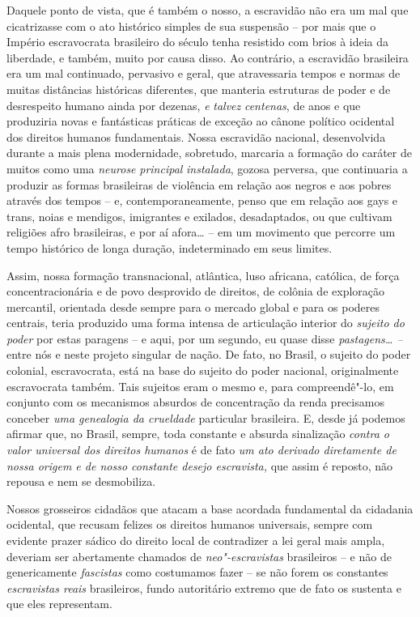 Daquele ponto de vista, que é também o nosso, a escravidão não era um
mal que cicatrizasse com o ato histórico simples de sua suspensão -- por
mais que o Império escravocrata brasileiro do século  tenha resistido
com brios à ideia da liberdade, e também, muito por causa disso. Ao
contrário, a escravidão brasileira era um mal continuado, pervasivo e
geral, que atravessaria tempos e normas de muitas distâncias históricas
diferentes, que manteria estruturas de poder e de desrespeito humano
ainda por dezenas, \emph{e} \emph{talvez} \emph{centenas}, de anos e que
produziria novas e fantásticas práticas de exceção ao cânone político
ocidental dos direitos humanos fundamentais. Nossa escravidão nacional,
desenvolvida durante a mais plena modernidade, sobretudo, marcaria a
formação do caráter de muitos como uma \emph{neurose} \emph{principal}
\emph{instalada}, gozosa perversa, que continuaria a produzir as formas
brasileiras de violência em relação aos negros e aos pobres através dos
tempos -- e, contemporaneamente, penso que em relação aos gays e trans,
noias e mendigos, imigrantes e exilados, desadaptados, ou que cultivam
religiões afro brasileiras, e por aí afora\ldots{} -- em um movimento que
percorre um tempo histórico de longa duração, indeterminado em seus
limites.

Assim, nossa formação transnacional, atlântica, luso africana, católica,
de força concentracionária e de povo desprovido de direitos, de colônia
de exploração mercantil, orientada desde sempre para o mercado global e
para os poderes centrais, teria produzido uma forma intensa de
articulação interior do \emph{sujeito do poder} por estas paragens -- e
aqui, por um segundo, eu quase disse \emph{pastagens\ldots{} --} entre nós e
neste projeto singular de nação. De fato, no Brasil, o sujeito do poder
colonial, escravocrata, está na base do sujeito do poder nacional,
originalmente escravocrata também. Tais sujeitos eram o mesmo e, para
compreendê"-lo, em conjunto com os mecanismos absurdos de concentração da
renda precisamos conceber \emph{uma genealogia da crueldade} particular
brasileira. E, desde já podemos afirmar que, no Brasil, sempre, toda
constante e absurda sinalização \emph{contra o valor universal dos
direitos humanos} é de fato \emph{um ato derivado diretamente de nossa
origem e de nosso constante desejo escravista,} que assim é reposto, não
repousa e nem se desmobiliza.

Nossos grosseiros cidadãos que atacam a base acordada fundamental da
cidadania ocidental, que recusam felizes os direitos humanos universais,
sempre com evidente prazer sádico do direito local de contradizer a lei
geral mais ampla, deveriam ser abertamente chamados de
\emph{neo"-escravistas} brasileiros -- e não de genericamente
\emph{fascistas} como costumamos fazer -- se não forem os constantes
\emph{escravistas reais} brasileiros, fundo autoritário extremo que de
fato os sustenta e que eles representam.


